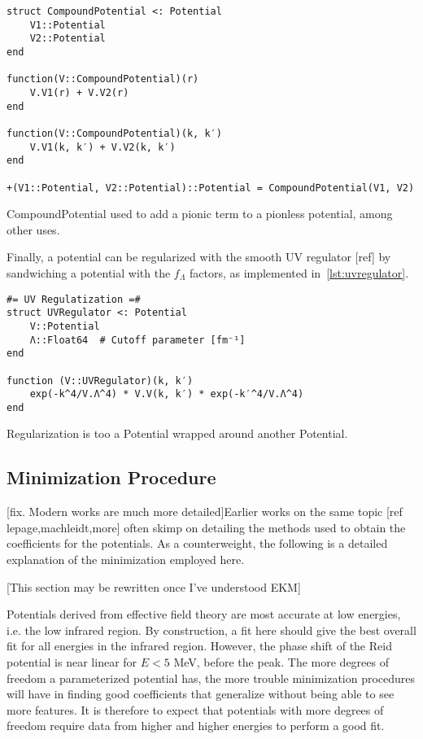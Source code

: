 \begin{listing}
\begin{verbatim}
struct CompoundPotential <: Potential
    V1::Potential
    V2::Potential
end

function(V::CompoundPotential)(r)
    V.V1(r) + V.V2(r)
end

function(V::CompoundPotential)(k, k′)
    V.V1(k, k′) + V.V2(k, k′)
end

+(V1::Potential, V2::Potential)::Potential = CompoundPotential(V1, V2)

\end{verbatim}
\caption{CompoundPotential used to add a pionic term to a pionless potential,
among other uses.\label{lst:compoundpotential}}
\end{listing}

Finally, a potential can be regularized with the smooth UV regulator [ref] by
sandwiching a potential with the \(f_{\Lambda}\) factors, as implemented in~\cref{lst:uvregulator}.

\begin{listing}
\begin{verbatim}
#= UV Regulatization =#
struct UVRegulator <: Potential
    V::Potential
    Λ::Float64  # Cutoff parameter [fm⁻¹]
end

function (V::UVRegulator)(k, k′)
    exp(-k^4/V.Λ^4) * V.V(k, k′) * exp(-k′^4/V.Λ^4)
end
\end{verbatim}
\caption{Regularization is too a \textsf{Potential} wrapped around another \textsf{Potential}.\label{lst:uvregulator}}
\end{listing}

\subsection{Minimization Procedure}

[fix. Modern works are much more detailed]Earlier works on the same topic [ref lepage,machleidt,more] often skimp on
detailing the methods used
to obtain the coefficients for the potentials. As a counterweight, the following is
a detailed explanation of the minimization employed here.

[This section may be rewritten once I've understood EKM]

Potentials derived from effective field theory are most accurate at low
energies, i.e. the low infrared region. By construction, a fit here should give
the best overall fit for all energies in the infrared region. However, the phase
shift of the Reid potential is near linear for \(E<5\) MeV, before the peak. The
more degrees of freedom a parameterized potential has, the more trouble minimization
procedures will have in finding good coefficients that generalize without
being able to see more features. It is therefore to expect that potentials with
more degrees of freedom require data from higher and higher energies to perform
a good fit.

